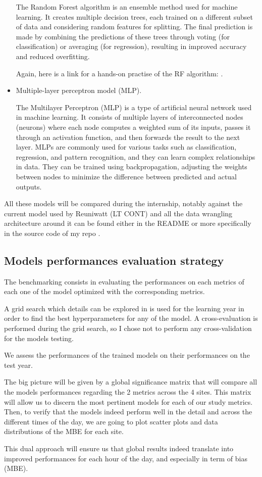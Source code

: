 \begin{itemize}
    The Random Forest algorithm is an ensemble method used for machine learning. It creates multiple decision trees, each trained on a different subset of data and considering random features for splitting. The final prediction is made by combining the predictions of these trees through voting (for classification) or averaging (for regression), resulting in improved accuracy and reduced overfitting.

Again, here is a link for a hands-on practise of the RF algorithm: \cite{RF}.
    \item Multiple-layer perceptron model (MLP).

The Multilayer Perceptron (MLP) is a type of artificial neural network used in machine learning. It consists of multiple layers of interconnected nodes (neurons) where each node computes a weighted sum of its inputs, passes it through an activation function, and then forwards the result to the next layer. MLPs are commonly used for various tasks such as classification, regression, and pattern recognition, and they can learn complex relationships in data. They can be trained using backpropagation, adjusting the weights between nodes to minimize the difference between predicted and actual outputs.

\end{itemize}
All these models will be compared during the internship, notably against the current model used by Reuniwatt (LT CONT) and all the data wrangling architecture around it can be found either in the README or more specifically in the source code of my repo \cite{myrepo}.

\subsection{Models performances evaluation strategy}
The benchmarking consists in evaluating the performances on each metrics of each one of the model optimized with the corresponding metrics.

A grid search which details can be explored in \cite{myrepo} is used for the learning year in order to find the best hyperparameters for any of the model.
A cross-evaluation is performed during the grid search, so I chose not to perform any cross-validation for the models testing.

We assess the performances of the trained models on their performances on the test year.

The big picture will be given by a global significance matrix that will compare all the models performances regarding the 2 metrics across the 4 sites.
This matrix will allow us to discern the most pertinent models for each of our study metrics.
Then, to verify that the models indeed perform well in the detail and across the different times of the day, we are going to plot scatter plots and data distributions of the MBE for each site.

This dual approach will ensure us that global results indeed translate into improved performances for each hour of the day, and especially in term of bias (MBE).